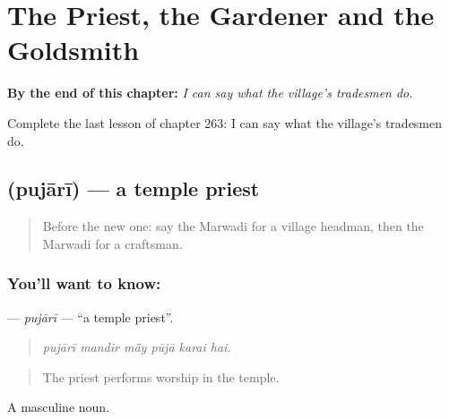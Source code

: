 
\chapter{The Priest, the Gardener and the Goldsmith}
\label{ch:mw-the-priest-the-gardener-and-the-goldsmith}

\begin{chapteropening}
\textbf{By the end of this chapter:} \emph{I can say what the village's tradesmen do.}

Complete the last lesson of chapter 263: I can say what the village's tradesmen do.
\end{chapteropening}

\section[\texorpdfstring{\mw{पुजारी} (pujārī)}{पुजारी (pujārī)}]{ (pujārī) — a temple priest}

\label{lesson:MW-C263-pujari}



\begin{quote}
Before the new one: say the Marwadi for a village headman, then the Marwadi for a craftsman.
\end{quote}

\subsection*{You'll want to know: }
\textbf{} — \emph{pujārī} — \textquotedblleft{}a temple priest\textquotedblright{}.

\begin{quote}
     
\end{quote}

\begin{quote}
\emph{pujārī mandir mā̃y pūjā karai hai.}
\end{quote}

\begin{quote}
The priest performs worship in the temple.
\end{quote}

A masculine noun.

